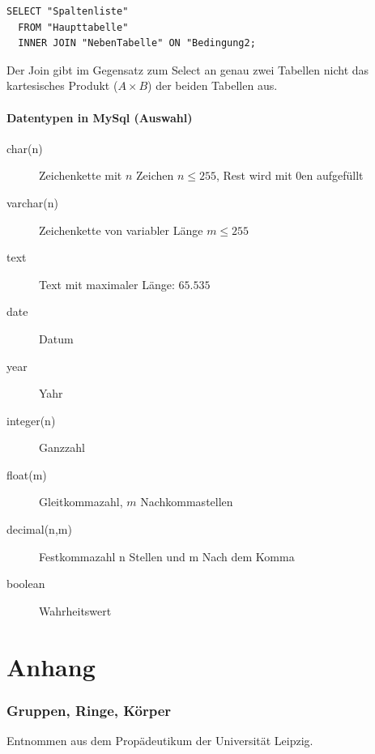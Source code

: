 \documentclass[a4paper,10pt,DIV9, BCOR12mm, oneside,openright,openbib]{scrreprt}
\theoremstyle{definition}
\theoremstyle{plain}
\begin{document}
\vspace{5ex}
\begin{lstlisting}[caption=Inner Join]
SELECT "Spaltenliste"
  FROM "Haupttabelle"
  INNER JOIN "NebenTabelle" ON "Bedingung2;
\end{lstlisting}
Der Join gibt im Gegensatz zum Select an genau zwei Tabellen nicht das kartesisches Produkt ($A \times B$) der beiden Tabellen aus.

 \subsection{Datentypen in MySql (Auswahl)}
 \begin{description}
  \item [char(n)] Zeichenkette mit $n$ Zeichen $n \leq 255$, Rest wird mit 0en aufgefüllt
  \item [varchar(n)] Zeichenkette von variabler Länge $m \leq 255$
  \item [text] Text mit maximaler Länge: $65.535$
  \item [date] Datum
  \item [year] Yahr
  \item [integer(n)] Ganzzahl
  \item [float(m)] Gleitkommazahl, $m$ Nachkommastellen
  \item [decimal(n,m)] Festkommazahl n Stellen und m Nach dem Komma
  \item [boolean] Wahrheitswert
 \end{description}


 
 
 
\appendix  
\part{Anhang}
%


\begingroup
\printindex 
\endgroup
\section{Gruppen, Ringe, Körper} \label{subsec:GRK}
   Entnommen aus dem Propädeutikum der Universität Leipzig.
   

   
\end{document}
